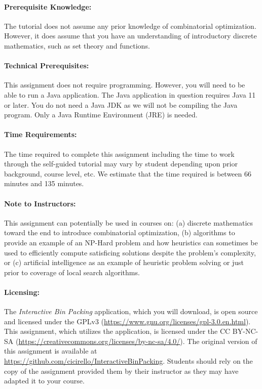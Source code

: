 \documentclass[11pt,letterpaper]{article}
\begin{document}
\paragraph*{Prerequisite Knowledge:} The tutorial does not assume
any prior knowledge of combinatorial optimization. However, it does 
assume that you have an understanding of introductory discrete mathematics,
such as set theory and functions.

\paragraph*{Technical Prerequisites:} This assignment does not require
programming. However, you will need to be able to run a Java application.
The Java application in question requires Java 11 or later. You do not need
a Java JDK as we will not be compiling the Java program. Only a Java Runtime
Environment (JRE) is needed.

\paragraph*{Time Requirements:} The time required to complete this assignment
including the time to work through the self-guided tutorial may vary by
student depending upon prior background, course level, etc. We estimate that
the time required is between 66 minutes and 135 minutes.

\paragraph*{Note to Instructors:} This assignment can potentially be used
in courses on: (a) discrete mathematics toward the end to introduce 
combinatorial optimization, (b) algorithms to provide an example of an
NP-Hard problem and how heuristics can sometimes be used to efficiently
compute satisficing solutions despite the problem's complexity, or (c)
artificial intelligence as an example of heuristic problem solving or
just prior to coverage of local search algorithms.

\paragraph*{Licensing:} The {\em Interactive Bin Packing} application,
which you will download, is open source and licensed under the GPLv3 
(\url{https://www.gnu.org/licenses/gpl-3.0.en.html}). This assignment,
which utilizes the application, is licensed under the CC BY-NC-SA
(\url{https://creativecommons.org/licenses/by-nc-sa/4.0/}). The original
version of this assignment is available 
at \url{https://github.com/cicirello/InteractiveBinPacking}. Students 
should rely on the copy of the assignment provided them by their instructor
as they may have adapted it to your course. 
\end{document}
